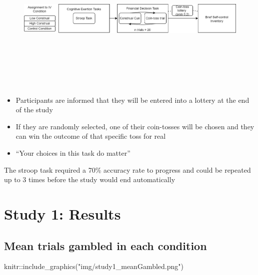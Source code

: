 \documentclass[
  letterpaper,
  DIV=11,
  numbers=noendperiod]{scrartcl}
\newenvironment{Shaded}{\begin{snugshade}}{\end{snugshade}}
\newcommand{\FunctionTok}[1]{\textcolor[rgb]{0.28,0.35,0.67}{#1}}
\newcommand{\NormalTok}[1]{\textcolor[rgb]{0.00,0.23,0.31}{#1}}
\newcommand{\SpecialCharTok}[1]{\textcolor[rgb]{0.37,0.37,0.37}{#1}}
\newcommand{\StringTok}[1]{\textcolor[rgb]{0.13,0.47,0.30}{#1}}
\begin{document}
\begin{figure}[H]

{\centering \includegraphics[width=13.54167in,height=2.8125in]{img/construal_study1_seq.drawio.png}

}

\end{figure}

\begin{itemize}
\item
  Participants are informed that they will be entered into a lottery at
  the end of the study
\item
  If they are randomly selected, one of their coin-tosses will be chosen
  and they can win the outcome of that specific toss for real
\item
  ``Your choices in this task do matter''
\end{itemize}

The stroop task required a 70\% accuracy rate to progress and could be
repeated up to 3 times before the study would end automatically

\hypertarget{study-1-results}{%
\section{Study 1: Results}\label{study-1-results}}

\hypertarget{mean-trials-gambled-in-each-condition}{%
\subsection{Mean trials gambled in each
condition}\label{mean-trials-gambled-in-each-condition}}

\begin{Shaded}
\begin{Highlighting}[]
\NormalTok{knitr}\SpecialCharTok{::}\FunctionTok{include\_graphics}\NormalTok{(}\StringTok{"img/study1\_meanGambled.png"}\NormalTok{)}
\end{Highlighting}
\end{Shaded}
\end{document}
